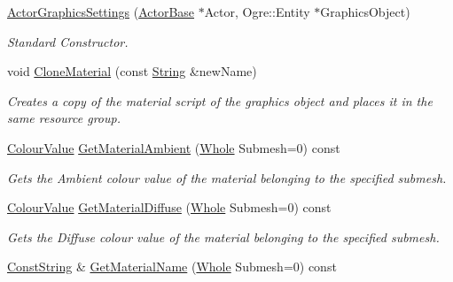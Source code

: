 \begin{DoxyCompactItemize}
\item 
\hyperlink{classphys_1_1ActorGraphicsSettings_a33472d07ddaaf630e4e7b8c94190df0a}{ActorGraphicsSettings} (\hyperlink{classphys_1_1ActorBase}{ActorBase} $\ast$Actor, Ogre::Entity $\ast$GraphicsObject)
\begin{DoxyCompactList}\small\item\em Standard Constructor. \item\end{DoxyCompactList}\item 
void \hyperlink{classphys_1_1ActorGraphicsSettings_a82baed53d2390cba593b30d6da064f66}{CloneMaterial} (const \hyperlink{namespacephys_aa03900411993de7fbfec4789bc1d392e}{String} \&newName)
\begin{DoxyCompactList}\small\item\em Creates a copy of the material script of the graphics object and places it in the same resource group. \item\end{DoxyCompactList}\item 
\hyperlink{classphys_1_1ColourValue}{ColourValue} \hyperlink{classphys_1_1ActorGraphicsSettings_a7cebcdcf70ffedf15ece92c1326a95c3}{GetMaterialAmbient} (\hyperlink{namespacephys_a460f6bc24c8dd347b05e0366ae34f34a}{Whole} Submesh=0) const 
\begin{DoxyCompactList}\small\item\em Gets the Ambient colour value of the material belonging to the specified submesh. \item\end{DoxyCompactList}\item 
\hyperlink{classphys_1_1ColourValue}{ColourValue} \hyperlink{classphys_1_1ActorGraphicsSettings_ab4b2a4938c6fb0c400882fb929bc7133}{GetMaterialDiffuse} (\hyperlink{namespacephys_a460f6bc24c8dd347b05e0366ae34f34a}{Whole} Submesh=0) const 
\begin{DoxyCompactList}\small\item\em Gets the Diffuse colour value of the material belonging to the specified submesh. \item\end{DoxyCompactList}\item 
\hyperlink{namespacephys_a5ce5049f8b4bf88d6413c47b504ebb31}{ConstString} \& \hyperlink{classphys_1_1ActorGraphicsSettings_aa1d57793e97d280acac5a8c8fe8b4cc3}{GetMaterialName} (\hyperlink{namespacephys_a460f6bc24c8dd347b05e0366ae34f34a}{Whole} Submesh=0) const 

\end{DoxyCompactItemize}
